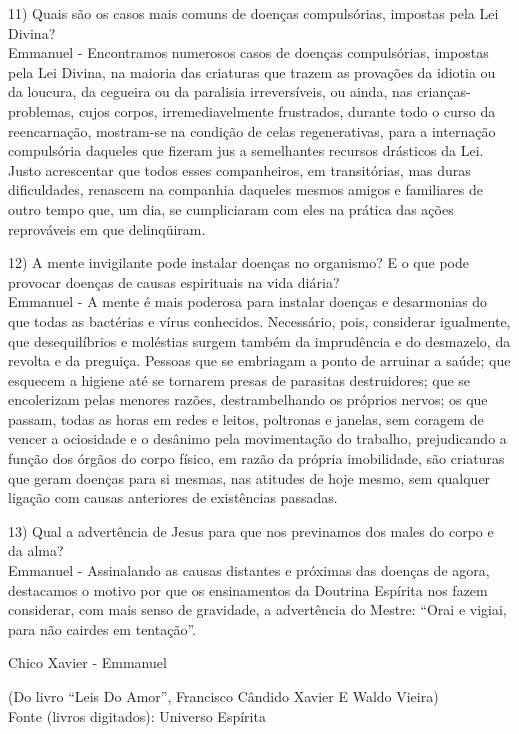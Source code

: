 \emdash{}11) Quais são os casos mais comuns de doenças compulsórias, impostas pela Lei Divina?\\
\emdash{}Emmanuel - Encontramos numerosos casos de doenças compulsórias, impostas pela Lei Divina, na maioria das criaturas que trazem as provações da idiotia ou da loucura, da cegueira ou da paralisia irreversíveis, ou ainda, nas crianças-problemas, cujos corpos, irremediavelmente frustrados, durante todo o curso da reencarnação, mostram-se na condição de celas regenerativas, para a internação compulsória daqueles que fizeram jus a semelhantes recursos drásticos da Lei. Justo acrescentar que todos esses companheiros, em transitórias, mas duras dificuldades, renascem na companhia daqueles mesmos amigos e familiares de outro tempo que, um dia, se cumpliciaram com eles na prática das ações reprováveis em que delinqüiram.

\emdash{}12) A mente invigilante pode instalar doenças no organismo? E o que pode provocar doenças de causas espirituais na vida diária?\\
\emdash{}Emmanuel - A mente é mais poderosa para instalar doenças e desarmonias do que todas as bactérias e vírus conhecidos. Necessário, pois, considerar igualmente, que desequilíbrios e moléstias surgem também da imprudência e do desmazelo, da revolta e da preguiça. Pessoas que se embriagam a ponto de arruinar a saúde; que esquecem a higiene até se tornarem presas de parasitas destruidores; que se encolerizam pelas menores razões, destrambelhando os próprios nervos; os que passam, todas as horas em redes e leitos, poltronas e janelas, sem coragem de vencer a ociosidade e o desânimo pela movimentação do trabalho, prejudicando a função dos órgãos do corpo físico, em razão da própria imobilidade, são criaturas que geram doenças para si mesmas, nas atitudes de hoje mesmo, sem qualquer ligação com causas anteriores de existências passadas.

\emdash{}13) Qual a advertência de Jesus para que nos previnamos dos males do corpo e da alma?\\
\emdash{}Emmanuel - Assinalando as causas distantes e próximas das doenças de agora, destacamos o motivo por que os ensinamentos da Doutrina Espírita nos fazem considerar, com mais senso de gravidade, a advertência do Mestre: “Orai e vigiai, para não cairdes em tentação”.

\emdash{}Chico Xavier - Emmanuel

\emdash{}(Do livro “Leis Do Amor”, Francisco Cândido Xavier E Waldo Vieira)\\
\emdash{}Fonte (livros digitados): Universo Espírita